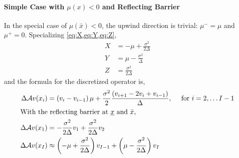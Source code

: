 \documentclass[11pt]{etk-article}
\begin{document}
\paragraph{Simple Case with $\mu(x) < 0$ and Reflecting Barrier}
In the special case of $\mu(\bar{x}) < 0$, the upwind direction is trivial: $\mu^{-} = \mu$ and $\mu^{+} = 0$.  Specializing \cref{eq:X,eq:Y,eq:Z},
\begin{align}
	X &= - \mu+ \frac{\sigma^{2}}{2 \Delta}\label{eq:X-backwards} \\
	Y &= \mu - \frac{\sigma^{2}}{\Delta}\label{eq:Y-backwards} \\
	Z &= \frac{\sigma^{2}}{2 \Delta}\label{eq:Z-backwards}
\end{align}
and the formula for the discretized operator is,
\begin{align}
	\Delta \mathcal{A} v(x_i)  &= \left(v_i-v_{i-1}\right)\mu + \frac{\sigma^2}{2} \frac{\left(v_{i+1} - 2 v_i + v_{i-1}\right)}{\Delta},\quad \text{ for } i = 2,\ldots I-1\\
	\intertext{With the reflecting barrier at $\underline{x}$ and $\bar{x}$,}
	\Delta \mathcal{A} v(x_1) &= -\frac{\sigma^{2}}{2\Delta}v_1 + \frac{\sigma^{2}}{2\Delta} v_2\\
\Delta \mathcal{A} v(x_I)&\approx \left(-\mu +\frac{\sigma^2}{2\Delta}\right) v_{I-1} + \left(\mu - \frac{\sigma^2}{2\Delta}\right) v_I 
\end{align}
\end{document}
